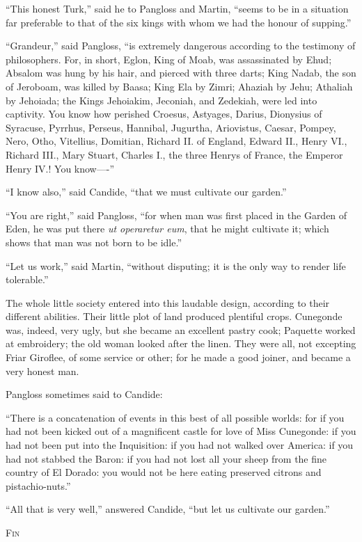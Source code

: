 ``This honest Turk,'' said he to Pangloss and Martin, ``seems to be in a situation far preferable to that of the six kings with whom we had the honour of supping.''

``Grandeur,'' said Pangloss, ``is extremely dangerous according to the testimony of philosophers. For, in short, Eglon, King of Moab, was assassinated by Ehud; Absalom was hung by his hair, and pierced with three darts; King Nadab, the son of Jeroboam, was killed by Baasa; King Ela by Zimri; Ahaziah by Jehu; Athaliah by Jehoiada; the Kings Jehoiakim, Jeconiah, and Zedekiah, were led into captivity. You know how perished Croesus, Astyages, Darius, Dionysius of Syracuse, Pyrrhus, Perseus, Hannibal, Jugurtha, Ariovistus, Caesar, Pompey, Nero, Otho, Vitellius, Domitian, Richard II. of England, Edward II., Henry VI., Richard III., Mary Stuart, Charles I., the three Henrys of France, the Emperor Henry IV.! You know----''

``I know also,'' said Candide, ``that we must cultivate our garden.''

``You are right,'' said Pangloss, ``for when man was first placed in the Garden of Eden, he was put there \textit{ut operaretur eum}, that he might cultivate it; which shows that man was not born to be idle.''

``Let us work,'' said Martin, ``without disputing; it is the only way to render life tolerable.''

The whole little society entered into this laudable design, according to their different abilities. Their little plot of land produced plentiful crops. Cunegonde was, indeed, very ugly, but she became an excellent pastry cook; Paquette worked at embroidery; the old woman looked after the linen. They were all, not excepting Friar Giroflee, of some service or other; for he made a good joiner, and became a very honest man.

Pangloss sometimes said to Candide:

``There is a concatenation of events in this best of all possible worlds: for if you had not been kicked out of a magnificent castle for love of Miss Cunegonde: if you had not been put into the Inquisition: if you had not walked over America: if you had not stabbed the Baron: if you had not lost all your sheep from the fine country of El Dorado: you would not be here eating preserved citrons and pistachio-nuts.''

``All that is very well,'' answered Candide, ``but let us cultivate our garden.''

\begin{center}
\vspace{1cm}
\textsc{Fin}	
\end{center}
